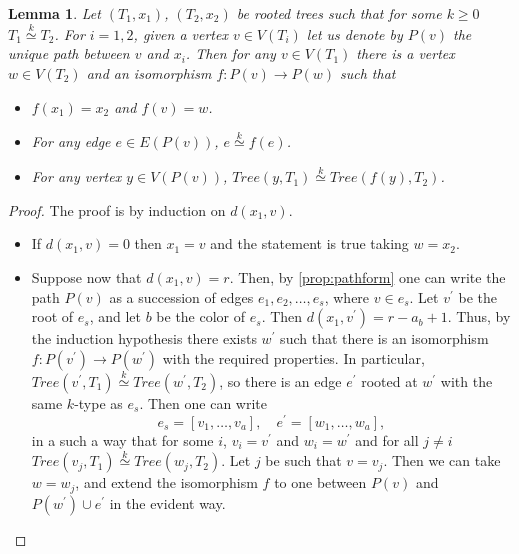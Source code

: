 \documentclass[11pt,notitlepage]{report}
\newtheorem{lemma}{Lemma}[chapter]
\theoremstyle{definition}
\newcommand{\morph}[1]{\stackrel{#1}{\simeq}}
\begin{document}
\begin{lemma} \label{lem:path}
	Let $(T_1,x_1)$, $(T_2,x_2)$ be rooted trees such that for some $k\geq 0$
	$T_1\morph{k} T_2$. For $i=1,2$, given a vertex $v\in V(T_i)$ let us denote by
	$P(v)$ the unique path between $v$ and $x_i$.
	Then for any $v\in V(T_1)$ there is a vertex $w\in V(T_2)$ and an isomorphism
	$f:P(v)\rightarrow P(w)$ such that
	\begin{itemize}
		\item[(1)]  $f(x_1)=x_2$ and $f(v)=w$.
		\item[(2)] For any edge $e\in E(P(v))$, $e\morph{k} f(e)$.
		\item[(3)] For any vertex $y\in V(P(v))$, $Tree(y,T_1)\morph{k} Tree(f(y),T_2)$.
	\end{itemize}
\end{lemma}
\begin{proof}
	The proof is by induction on $d(x_1, v)$.
	\begin{itemize}[leftmargin=*]
		\item If $d(x_1,v)=0$ then $x_1=v$ and the statement is true taking $w=x_2$.
		\item Suppose now that $d(x_1,v)=r$. Then, by
		\cref{prop:pathform} one can write the path $P(v)$ as a
		succession of edges $e_1,e_2,\dots, e_s$, where $v\in e_s$.
		Let $v^\prime$ be the root of $e_s$, and let $b$ be the color
		of $e_s$.
		Then $d(x_1,v^\prime)=r-a_b+1$.
		Thus, by the
		induction hypothesis there exists $w^\prime$ such that there is an isomorphism
		$f: P(v^\prime)\rightarrow P(w^\prime)$ with the required properties. 
		In particular, $Tree(v^\prime,T_1)\morph{k}Tree(w^\prime,T_2)$, so there is an
		edge $e^\prime$ rooted at $w^\prime$ with the same $k$-type as $e_s$. Then one can write
		\[e_s=[v_1,\dots,v_a], \quad  e^\prime=[w_1,\dots,w_a], \]
		in a such a way that for some $i$, $v_i=v^\prime$ and $w_i=w^\prime$ and for all $j\neq i$
		$Tree(v_j,T_1)\morph{k} Tree(w_j,T_2)$. Let $j$ be such that $v=v_j$. Then we can take
		$w=w_j$, and extend the isomorphism $f$ to one between $P(v)$ and
		$P(w^\prime)\cup e^\prime$
		in the evident way. 
	\end{itemize}
\end{proof}
\end{document}
